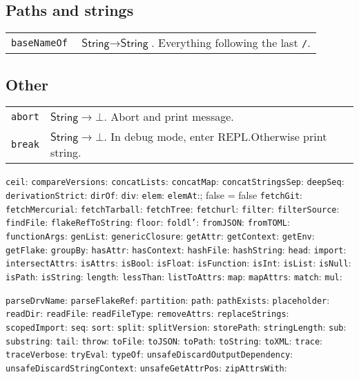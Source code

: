 \documentclass[10pt, a4paper, landscape]{article}
\newcommand{\cmd}[1]{\texttt{#1}}
\newcommand{\str}{\textsf{String}}
\begin{document}
\begin{multicols*}{3}
\begin{tabularx}{\columnwidth}{@{}l>{\raggedright\arraybackslash}X@{}}
\end{tabularx}

\subsection*{Paths and strings}
\begin{tabularx}{\columnwidth}{@{}l>{\raggedright\arraybackslash}X@{}}
\cmd{baseNameOf} & $\str\to\str$. Everything following the last \cmd{/}.

\end{tabularx}

\subsection*{Other}
\begin{tabularx}{\columnwidth}{@{}l>{\raggedright\arraybackslash}X@{}}
\cmd{abort} & $\str \to \bot $. Abort and print message. \\
\cmd{break} & $\str \to \bot $. In debug mode, enter REPL.\@ Otherwise print string.

\end{tabularx}


\cmd{ceil}:
\cmd{compareVersions}:
\cmd{concatLists}:
\cmd{concatMap}:
\cmd{concatStringsSep}:
\cmd{deepSeq}:
\cmd{derivationStrict}:
\cmd{dirOf}:
\cmd{div}:
\cmd{elem}:
\cmd{elemAt}:; false = false
\cmd{fetchGit}:
\cmd{fetchMercurial}:
\cmd{fetchTarball}:
\cmd{fetchTree}:
\cmd{fetchurl}:
\cmd{filter}:
\cmd{filterSource}:
\cmd{findFile}:
\cmd{flakeRefToString}:
\cmd{floor}:
\cmd{foldl'}:
\cmd{fromJSON}:
\cmd{fromTOML}:
\cmd{functionArgs}:
\cmd{genList}:
\cmd{genericClosure}:
\cmd{getAttr}:
\cmd{getContext}:
\cmd{getEnv}:
\cmd{getFlake}:
\cmd{groupBy}:
\cmd{hasAttr}:
\cmd{hasContext}:
\cmd{hashFile}:
\cmd{hashString}:
\cmd{head}:
\cmd{import}:
\cmd{intersectAttrs}:
\cmd{isAttrs}:
\cmd{isBool}:
\cmd{isFloat}:
\cmd{isFunction}:
\cmd{isInt}:
\cmd{isList}:
\cmd{isNull}:
\cmd{isPath}:
\cmd{isString}:
\cmd{length}:
\cmd{lessThan}:
\cmd{listToAttrs}:
\cmd{map}:
\cmd{mapAttrs}:
\cmd{match}:
\cmd{mul}:

\cmd{parseDrvName}:
\cmd{parseFlakeRef}:
\cmd{partition}:
\cmd{path}:
\cmd{pathExists}:
\cmd{placeholder}:
\cmd{readDir}:
\cmd{readFile}:
\cmd{readFileType}:
\cmd{removeAttrs}:
\cmd{replaceStrings}:
\cmd{scopedImport}:
\cmd{seq}:
\cmd{sort}:
\cmd{split}:
\cmd{splitVersion}:
\cmd{storePath}:
\cmd{stringLength}:
\cmd{sub}:
\cmd{substring}:
\cmd{tail}:
\cmd{throw}:
\cmd{toFile}:
\cmd{toJSON}:
\cmd{toPath}:
\cmd{toString}:
\cmd{toXML}:
\cmd{trace}:
\cmd{traceVerbose}:
\cmd{tryEval}:
\cmd{typeOf}:
\cmd{unsafeDiscardOutputDependency}:
\cmd{unsafeDiscardStringContext}:
\cmd{unsafeGetAttrPos}:
\cmd{zipAttrsWith}:

  

\end{multicols*}
\end{document}
